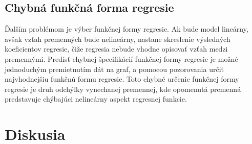 \documentclass[]{tukediphc}
\begin{document}
\subsection{Chybná funkčná forma regresie}

Ďalším problémom je výber funkčnej formy regresie. Ak bude model lineárny, avšak vzťah premenných bude nelineárny, nastane skreslenie výsledných koeficientov regresie, čiže regresia nebude vhodne opisovať vzťah medzi premennými. Predísť chybnej špecifikácií funkčnej formy regresie je možné jednoduchým premietnutím dát na graf, a pomocou pozorovania určiť najvhodnejšiu funkčnú formu regresie. Toto chybné určenie funkčnej formy regresie je druh odchýlky vynechanej premennej, kde opomenutá premenná predstavuje chýbajúci nelineárny aspekt regresnej funkcie. 



\newpage
{}
\section*{Diskusia}
\end{document}
